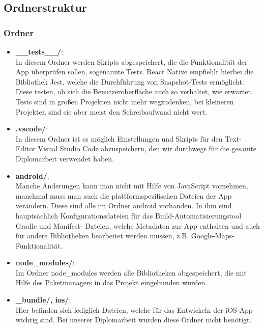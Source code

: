 \newpage

\subsection{Ordnerstruktur}

\subsubsection{Ordner}


\begin{itemize}
\item \textbf{\_\_tests\_\_/}:\\
In diesem Ordner werden Skripts abgespeichert, die die Funktionalität der App überprüfen sollen,
sogenannte Tests. React Native empfiehlt hierbei die Bibliothek Jest, welche die Durchführung von
Snapshot-Tests ermöglicht. Diese testen, ob sich die Benutzeroberfläche auch so verhaltet, wie
erwartet. Tests sind in großen Projekten nicht mehr wegzudenken, bei kleineren Projekten sind sie
aber meist den Schreibaufwand nicht wert.

\item \textbf{.vscode/}:\\
In diesem Ordner ist es möglich Einstellungen und Skripts für den Text-Editor Visual Studio Code
abzuspeichern, den wir durchwegs für die gesamte Diplomarbeit verwendet haben.

\item \textbf{android/}:\\
Manche Änderungen kann man nicht mit Hilfe von JavaScript vornehmen, manchmal muss man auch die
plattformspezifischen Dateien der App verändern. Diese sind alle im Ordner android vorhanden. In ihm
sind hauptsächlich Konfigurationsdateien für das Build-Automatisierungstool Gradle und Manifest-
Dateien, welche Metadaten zur App enthalten und auch für andere Bibliotheken bearbeitet werden
müssen, z.B. Google-Maps-Funktionalität.

\item \textbf{node\_modules/}:\\
Im Ordner node\_modules werden alle Bibliotheken abgespeichert, die mit Hilfe des Paketmanagers
in das Projekt eingebunden wurden.

\item \textbf{\_bundle/, ios/}:\\
Hier befinden sich lediglich Dateien, welche für das Entwickeln der iOS-App wichtig sind. Bei
unserer Diplomarbeit wurden diese Ordner nicht benötigt.

\end{itemize}

